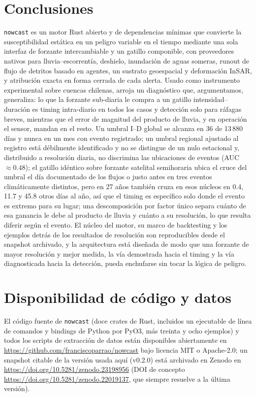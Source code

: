 \documentclass[authoryear,preprint,review,12pt]{elsarticle}
\begin{document}
\section{Conclusiones}

\texttt{nowcast} es un motor Rust abierto y de dependencias mínimas que convierte
la susceptibilidad estática en un peligro variable en el tiempo mediante una sola
interfaz de forzante intercambiable y un gatillo componible, con proveedores
nativos para lluvia--escorrentía, deshielo, inundación de aguas someras, runout de
flujo de detritos basado en agentes, un sustrato geoespacial y deformación InSAR, y
atribución exacta en forma cerrada de cada alerta. Usado como instrumento
experimental sobre cuencas chilenas, arroja un diagnóstico que, argumentamos, generaliza: lo que la forzante sub-diaria le compra a un gatillo intensidad--duración es timing intra-diario en todos los casos y detección solo para ráfagas breves, mientras que el error de magnitud del producto de lluvia, y en operación el sensor, mandan en el resto. Un umbral I--D global se alcanza en 36 de
13\,880 días y nunca en un mes con evento registrado; un umbral regional ajustado al registro está débilmente identificado y no se distingue de un nulo estacional y, distribuido a resolución diaria, no discrimina las ubicaciones de
eventos (AUC $\approx 0.48$); el gatillo idéntico sobre forzante satelital
semihoraria ubica el cruce del umbral el día documentado de los
flujos o justo antes en tres eventos climáticamente distintos, pero en 27 años
también cruza en esos núcleos en 0.4, 11.7 y 45.8 otros días al año, así que el
timing es específico solo donde el evento es extremo para su lugar; una descomposición
por factor único separa cuánto de esa ganancia le debe al producto de lluvia y
cuánto a su resolución, lo que resulta diferir según el evento. El núcleo del motor, su marco
de backtesting y los ejemplos detrás de los resultados de resolución son reproducibles desde el snapshot archivado, y la arquitectura está
diseñada de modo que una forzante de mayor resolución y mejor medida, la vía demostrada hacia el timing y la vía diagnosticada hacia la detección, pueda enchufarse sin tocar la lógica de peligro.

\section*{Disponibilidad de código y datos}

El código fuente de \texttt{nowcast} (doce crates de Rust, incluidos un ejecutable
de línea de comandos y bindings de Python por PyO3, más treinta y ocho ejemplos) y todos
los scripts de extracción de datos están disponibles abiertamente en
\url{https://github.com/franciscoparrao/nowcast} bajo licencia MIT o Apache-2.0; un
snapshot citable de la versión usada aquí (v0.2.0) está archivado en Zenodo en
\url{https://doi.org/10.5281/zenodo.23198956} (DOI de concepto
\url{https://doi.org/10.5281/zenodo.22019137}, que siempre resuelve a la última
versión).
\end{document}
